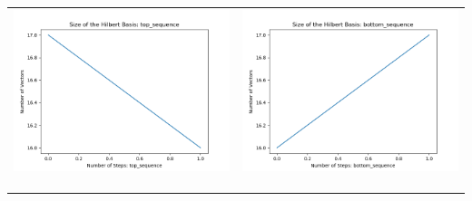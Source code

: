 \documentclass[10pt]{article}
\begin{document}
\begin{tabular}{c|c}
\begin{minipage}{.45\textwidth}
\includegraphics[width=\textwidth]{"DATA/5d/6 generators 1 bound B/top_sequence SIZE"}
\end{minipage} &
\begin{minipage}{.45\textwidth}
\includegraphics[width=\textwidth]{"DATA/5d/6 generators 1 bound B bottomup/bottom_sequence SIZE"}
\end{minipage} \\ \\
\hline \\\begin{minipage}{.45\textwidth}

\end{minipage}
\end{tabular}
\end{document}
